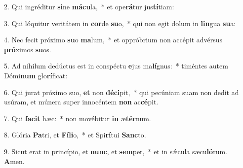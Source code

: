 2. Qui ingréditur \textbf{si}ne \textbf{má}\textbf{cu}la,~*  et ope\textbf{rá}tur jus\textbf{tí}tiam:\

3. Qui lóquitur veritátem in \textbf{cor}de \textbf{su}o,~*  qui non egit dolum in \textbf{lin}gua \textbf{su}a:\

4. Nec fecit próximo \textbf{su}o \textbf{ma}lum,~*  et oppróbrium non accépit advérsus \textbf{pró}ximos \textbf{su}os.\

5. Ad níhilum dedúctus est in conspéctu \textbf{e}jus ma\textbf{lí}gnus:~*  timéntes autem Dómi\textbf{num} glo\textbf{rí}ficat:\

6. Qui jurat próximo suo, \textbf{et} non \textbf{dé}\textbf{ci}pit,~*  qui pecúniam suam non dedit ad usúram, et múnera super innocéntem \textbf{non} ac\textbf{cé}pit.\

7. Qui \textbf{fa}\textbf{cit} hæc:~*  non movébitur \textbf{in} æ\textbf{tér}num.\

8. Glória \textbf{Pa}tri, et \textbf{Fí}\textbf{li}o,~*  et Spi\textbf{rí}tui \textbf{Sanc}to.\

9. Sicut erat in princípio, et \textbf{nunc}, et \textbf{sem}per,~*  et in sǽcula sæcu\textbf{ló}rum. \textbf{A}men.\

